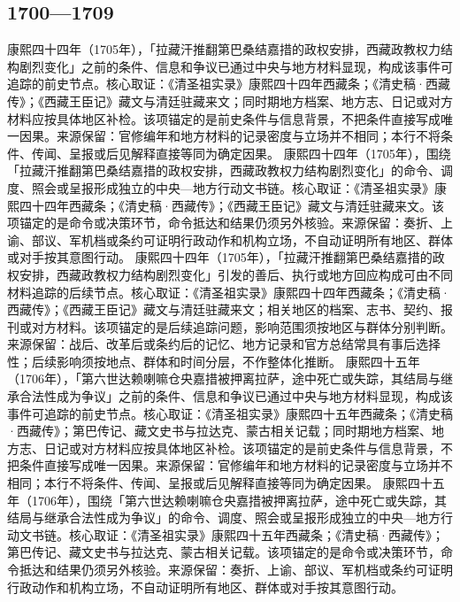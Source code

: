 \subsection{1700—1709}
康熙四十四年（1705年），「拉藏汗推翻第巴桑结嘉措的政权安排，西藏政教权力结构剧烈变化」之前的条件、信息和争议已通过中央与地方材料显现，构成该事件可追踪的前史节点。核心取证：《清圣祖实录》康熙四十四年西藏条；《清史稿·西藏传》；《西藏王臣记》藏文与清廷驻藏来文；同时期地方档案、地方志、日记或对方材料应按具体地区补检。该项锚定的是前史条件与信息背景，不把条件直接写成唯一因果。来源保留：官修编年和地方材料的记录密度与立场并不相同；本行不将条件、传闻、呈报或后见解释直接等同为确定因果。
康熙四十四年（1705年），围绕「拉藏汗推翻第巴桑结嘉措的政权安排，西藏政教权力结构剧烈变化」的命令、调度、照会或呈报形成独立的中央—地方行动文书链。核心取证：《清圣祖实录》康熙四十四年西藏条；《清史稿·西藏传》；《西藏王臣记》藏文与清廷驻藏来文。该项锚定的是命令或决策环节，命令抵达和结果仍须另外核验。来源保留：奏折、上谕、部议、军机档或条约可证明行政动作和机构立场，不自动证明所有地区、群体或对手按其意图行动。
康熙四十四年（1705年），「拉藏汗推翻第巴桑结嘉措的政权安排，西藏政教权力结构剧烈变化」引发的善后、执行或地方回应构成可由不同材料追踪的后续节点。核心取证：《清圣祖实录》康熙四十四年西藏条；《清史稿·西藏传》；《西藏王臣记》藏文与清廷驻藏来文；相关地区的档案、志书、契约、报刊或对方材料。该项锚定的是后续追踪问题，影响范围须按地区与群体分别判断。来源保留：战后、改革后或条约后的记忆、地方记录和官方总结常具有事后选择性；后续影响须按地点、群体和时间分层，不作整体化推断。
康熙四十五年（1706年），「第六世达赖喇嘛仓央嘉措被押离拉萨，途中死亡或失踪，其结局与继承合法性成为争议」之前的条件、信息和争议已通过中央与地方材料显现，构成该事件可追踪的前史节点。核心取证：《清圣祖实录》康熙四十五年西藏条；《清史稿·西藏传》；第巴传记、藏文史书与拉达克、蒙古相关记载；同时期地方档案、地方志、日记或对方材料应按具体地区补检。该项锚定的是前史条件与信息背景，不把条件直接写成唯一因果。来源保留：官修编年和地方材料的记录密度与立场并不相同；本行不将条件、传闻、呈报或后见解释直接等同为确定因果。
康熙四十五年（1706年），围绕「第六世达赖喇嘛仓央嘉措被押离拉萨，途中死亡或失踪，其结局与继承合法性成为争议」的命令、调度、照会或呈报形成独立的中央—地方行动文书链。核心取证：《清圣祖实录》康熙四十五年西藏条；《清史稿·西藏传》；第巴传记、藏文史书与拉达克、蒙古相关记载。该项锚定的是命令或决策环节，命令抵达和结果仍须另外核验。来源保留：奏折、上谕、部议、军机档或条约可证明行政动作和机构立场，不自动证明所有地区、群体或对手按其意图行动。
